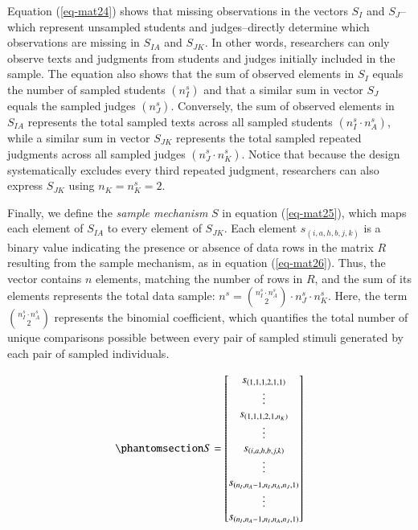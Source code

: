 \documentclass[
  authoryear,
  review,
  1p]{elsarticle}
\begin{document}
Equation (\ref{eq-mat24}) shows that missing observations in the vectors
\(S_{I}\) and \(S_{J}\)--which represent unsampled students and
judges--directly determine which observations are missing in \(S_{IA}\)
and \(S_{JK}\). In other words, researchers can only observe texts and
judgments from students and judges initially included in the sample. The
equation also shows that the sum of observed elements in \(S_{I}\)
equals the number of sampled students \((n^{s}_{I})\) and that a similar
sum in vector \(S_{J}\) equals the sampled judges \((n^{s}_{J})\).
Conversely, the sum of observed elements in \(S_{IA}\) represents the
total sampled texts across all sampled students
\((n^{s}_{I} \cdot n^{s}_{A})\), while a similar sum in vector
\(S_{JK}\) represents the total sampled repeated judgments across all
sampled judges \((n^{s}_{J} \cdot n^{s}_{K})\). Notice that because the
design systematically excludes every third repeated judgment,
researchers can also express \(S_{JK}\) using \(n_{K} = n^{s}_{K} = 2\).

Finally, we define the \emph{sample mechanism} \(S\) in equation
(\ref{eq-mat25}), which maps each element of \(S_{IA}\) to every element
of \(S_{JK}\). Each element \(s_{(i,a,h,b,j,k)}\) is a binary value
indicating the presence or absence of data rows in the matrix \(R\)
resulting from the sample mechanism, as in equation (\ref{eq-mat26}).
Thus, the vector contains \(n\) elements, matching the number of rows in
\(R\), and the sum of its elements represents the total data sample:
\(n^{s} = \binom{n^{s}_{I} \cdot n^{s}_{A}}{2} \cdot n^{s}_{J} \cdot n^{s}_{K}\).
Here, the term \({n^{s}_{I} \cdot n^{s}_{A} \choose 2}\) represents the
binomial coefficient, which quantifies the total number of unique
comparisons possible between every pair of sampled stimuli generated by
each pair of sampled individuals.

\begin{equation}\phantomsection\label{eq-mat25}{
S = \begin{bmatrix}
s_{(1,1,1,2,1,1)} \\
\vdots \\
s_{(1,1,1,2,1,n_{K})} \\
\vdots \\
s_{(i,a,h,b,j,k)} \\
\vdots \\
s_{(n_{I},n_{A}-1,n_{I},n_{A},n_{J},1)} \\
\vdots \\
s_{(n_{I},n_{A}-1,n_{I},n_{A},n_{J},1)}
\end{bmatrix}
}\end{equation}
\end{document}
